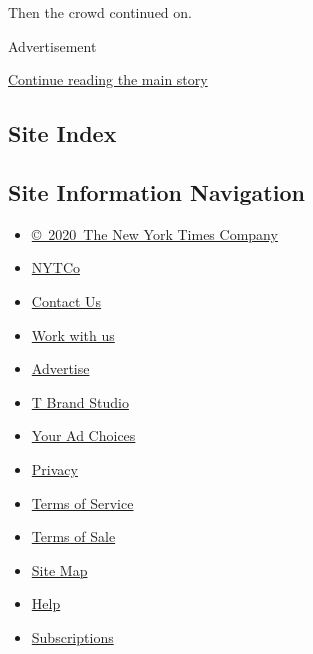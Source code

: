 Then the crowd continued on.

Advertisement

\protect\hyperlink{after-bottom}{Continue reading the main story}

\hypertarget{site-index}{%
\subsection{Site Index}\label{site-index}}

\hypertarget{site-information-navigation}{%
\subsection{Site Information
Navigation}\label{site-information-navigation}}

\begin{itemize}
\tightlist
\item
  \href{https://help.nytimes.com/hc/en-us/articles/115014792127-Copyright-notice}{©~2020~The
  New York Times Company}
\end{itemize}

\begin{itemize}
\tightlist
\item
  \href{https://www.nytco.com/}{NYTCo}
\item
  \href{https://help.nytimes.com/hc/en-us/articles/115015385887-Contact-Us}{Contact
  Us}
\item
  \href{https://www.nytco.com/careers/}{Work with us}
\item
  \href{https://nytmediakit.com/}{Advertise}
\item
  \href{http://www.tbrandstudio.com/}{T Brand Studio}
\item
  \href{https://www.nytimes.com/privacy/cookie-policy\#how-do-i-manage-trackers}{Your
  Ad Choices}
\item
  \href{https://www.nytimes.com/privacy}{Privacy}
\item
  \href{https://help.nytimes.com/hc/en-us/articles/115014893428-Terms-of-service}{Terms
  of Service}
\item
  \href{https://help.nytimes.com/hc/en-us/articles/115014893968-Terms-of-sale}{Terms
  of Sale}
\item
  \href{https://spiderbites.nytimes.com}{Site Map}
\item
  \href{https://help.nytimes.com/hc/en-us}{Help}
\item
  \href{https://www.nytimes.com/subscription?campaignId=37WXW}{Subscriptions}
\end{itemize}
